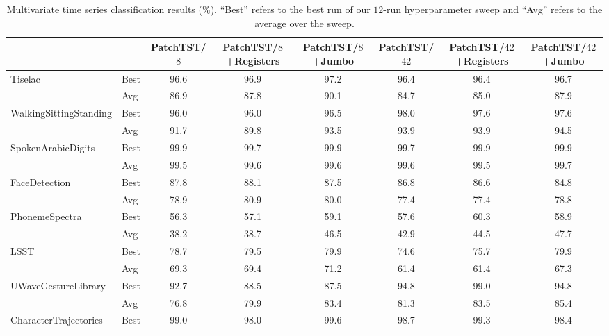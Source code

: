 \begin{table}[t]
    \centering
    \footnotesize
    \setlength{\tabcolsep}{2pt}
    \caption{Multivariate time series classification results ($\%$). ``Best'' refers to the best run of our $12$-run hyperparameter sweep and ``Avg'' refers to the average over the sweep.}
    \label{tab:all_time_multi}
    \begin{tabular}{llcccccc} 
        \toprule
        & & PatchTST/$8$ & \makecell{PatchTST/$8$\\+Registers} & \makecell{PatchTST/$8$\\+Jumbo} & PatchTST/$42$ & \makecell{PatchTST/$42$\\+Registers} & \makecell{PatchTST/$42$\\+Jumbo} \\
         \midrule
         \multirow{2}{*}{Tiselac} & Best & 96.6&	96.9&	97.2&	96.4&	96.4&	96.7\\
                                   & Avg  & 86.9&	87.8&	90.1&	84.7&	85.0&	87.9\\
         \multirow{2}{*}{WalkingSittingStanding} & Best & 96.0&	96.0&	96.5&	98.0&	97.6&	97.6 \\
                                       & Avg  & 91.7&	89.8&	93.5&	93.9&	93.9&	94.5\\
         \multirow{2}{*}{SpokenArabicDigits} & Best & 99.9&	99.7&	99.9&	99.7&	99.9&	99.9\\
                                   & Avg  & 99.5&	99.6&	99.6&	99.6&	99.5&	99.7\\
         \multirow{2}{*}{FaceDetection} & Best & 87.8&	88.1&	87.5&	86.8&	86.6&	84.8\\
                                       & Avg  & 78.9&	80.9&	80.0&	77.4&	77.4&	78.8\\
         \multirow{2}{*}{PhonemeSpectra} & Best & 56.3&	57.1&	59.1&	57.6&	60.3&	58.9\\
                                   & Avg  & 38.2&	38.7&	46.5&	42.9&	44.5&	47.7\\
         \multirow{2}{*}{LSST} & Best & 78.7&	79.5&	79.9&	74.6&	75.7&	79.9\\
                                       & Avg  & 69.3&	69.4&	71.2&	61.4&	61.4&	67.3\\
         \multirow{2}{*}{UWaveGestureLibrary} & Best & 92.7&	88.5&	87.5&	94.8&	99.0&	94.8\\
                                   & Avg  & 76.8&	79.9&	83.4&	81.3&	83.5&	85.4\\
         \multirow{2}{*}{CharacterTrajectories} & Best & 99.0&	98.0&	99.6&	98.7&	99.3&	98.4\\

\end{tabular}
\end{table}
